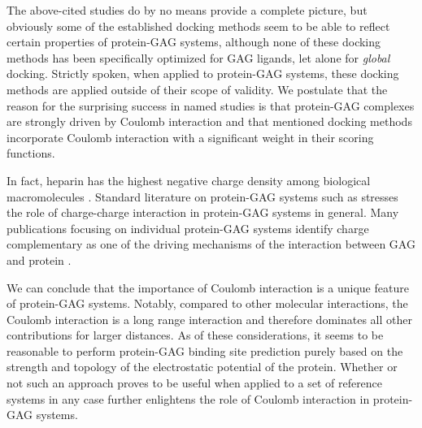 The above-cited studies do by no means provide a complete picture, but obviously
some of the established docking methods seem to be able to reflect certain
properties of protein-GAG systems, although none of these docking methods has
been specifically optimized for GAG ligands, let alone for \textit{global}
docking. Strictly spoken, when applied to protein-GAG systems, these docking
methods are applied outside of their scope of validity. We postulate that the
reason for the surprising success in named studies is that protein-GAG complexes
are strongly driven by Coulomb interaction and that mentioned docking methods
incorporate Coulomb interaction with a significant weight in their scoring
functions.

In fact, heparin has the highest negative charge density among biological
macromolecules \cite{capila_linhardt_hep_prot_2002}. Standard literature on
protein-GAG systems such as
\cite{essentials_glycobiology_gags_2009} stresses the role of charge-charge
interaction in protein-GAG systems in general. Many publications focusing on
individual protein-GAG systems identify charge complementary as one of the
driving mechanisms of the interaction between GAG and protein
\cite{gandhi_bmp_heparin_binding_sites_2012,faham_heparin_1996,%
pichert_characterization_2012,rogers_gag_prot_prot_2011}.


We can conclude that the importance of Coulomb interaction is a unique feature
of protein-GAG systems. Notably, compared to other molecular interactions, the
Coulomb interaction is a long range interaction and therefore dominates all
other contributions for larger distances. As of these considerations, it seems
to be reasonable to perform protein-GAG binding site prediction purely based on
the strength and topology of the electrostatic potential of the protein. Whether
or not such an approach proves to be useful when applied to a set of reference
systems in any case further enlightens the role of Coulomb interaction in
protein-GAG systems.

%

